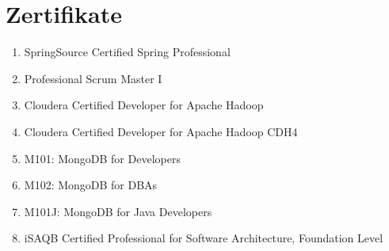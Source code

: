 \section*{Zertifikate}
\begin{enumerate}[label=,leftmargin=0cm,itemsep=10pt]
\item SpringSource Certified Spring Professional
\item Professional Scrum Master I
\item Cloudera Certified Developer for Apache Hadoop
\item Cloudera Certified Developer for Apache Hadoop CDH4
\item M101: MongoDB for Developers
\item M102: MongoDB for DBAs
\item M101J: MongoDB for Java Developers
\item iSAQB Certified Professional for Software Architecture, Foundation Level
\end{enumerate}